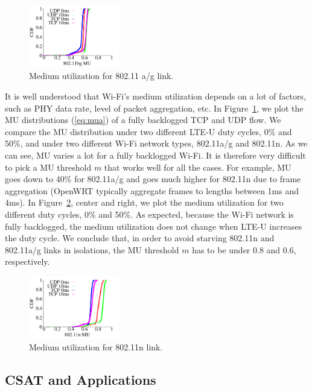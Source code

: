 \begin{figure}[htb!]
 \centering
    \includegraphics[width=0.35\textwidth]{./figures/csat_mu_80211bg}
 \caption{Medium utilization for 802.11 a/g link.}
  \label{fig:mu_examples_ag}
\end{figure}

It is well understood that Wi-Fi's medium utilization depends on a lot of factors, such as PHY data rate, level of packet aggregation, etc. In Figure~\ref{fig:mu_examples_ag}, we plot the MU distributions (\ref{eq:mua}) of a fully backlogged TCP and UDP flow. 
We compare the MU distribution under two different LTE-U duty cycles, 0\% and 50\%, 
and under two different Wi-Fi network types, 802.11a/g and 802.11n.
As we can see, MU varies a lot for a fully backlogged Wi-Fi.
It is therefore very difficult to pick a MU threshold $m$ that works well for all the cases. 
For example, MU goes down to 40\% for 802.11a/g and goes much higher for 802.11n
due to frame aggregation (OpenWRT typically aggregate frames to lengths between 1ms and 4ms).
In Figure~\ref{fig:mu_examples_n}, center and right, we plot the medium utilization for two different duty cycles, 0\% and 50\%. 
As expected, because the Wi-Fi network is fully backlogged, the medium utilization does not change when LTE-U increases the duty cycle. 
We conclude that, in order to avoid starving 802.11n and 802.11a/g links in isolations, 
the MU threshold $m$ has to be under 0.8 and 0.6, respectively. 



\begin{figure}[htb!]
 \centering
    \includegraphics[width=0.35\textwidth]{./figures/csat_mu_80211n}
 \caption{Medium utilization for 802.11n link.}
  \label{fig:mu_examples_n}
\end{figure}


\subsection{CSAT and Applications}

